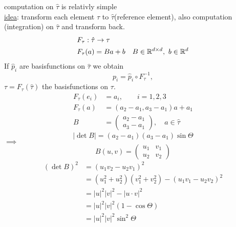 \par
computation on $\hat{\tau}$ is relativly simple\\
\underline{idea}: transform each element $\tau$ to $\hat{\tau}$(reference element), also computation (integration) on $\hat{\tau}$ and transform back.\\

\begin{align*}
	&F_{\tau}: \hat{\tau} \to \tau\\
	&F_{\tau}(a) = Ba +b \quad B\in \mathbb{R}^{d\times d},\ b \in \mathbb{R}^d
\end{align*}
If $\hat{p}_i$ are basisfunctions on $\hat{\tau}$ we obtain 
\begin{equation*}
	p_i = \hat{p}_i \circ F^{-1}_{\tau},
\end{equation*}
$\tau = F_{\tau}(\hat{\tau})$ the basisfunctions on $\tau$.
\begin{align*}
	F_{\tau}(e_i) &= a_i, \qquad i=1,2,3\\
	F_{\tau}(a) &= (a_2-a_1,a_3-a_1)a + a_1\\
	B &=
	\begin{pmatrix}
	a_2-a_1\\
	a_3-a_1
	\end{pmatrix}
	,\quad a \in \hat{\tau}
\end{align*}
\begin{equation*}
	|\det B| = (a_2-a_1)(a_3-a_1)\sin \Theta
\end{equation*}
$\implies$
\begin{equation*}
	B(u,v) = 
	\begin{pmatrix}
	u_1 & v_1\\
	u_2 & v_2
	\end{pmatrix}
\end{equation*}
\begin{align*}
	(\det B)^2 & = (u_1v_2 - u_2v_1)^2\\
	& = (u^2_1+ u^2_2)(v^2_1+v^2_2)-(u_1v_1-u_2v_2)^2\\
	& = |u|^2|v|^2 - |u\cdot v|^2\\
	& = |u|^2|v|^2 (1- \cos \Theta)\\
	& = |u|^2|v|^2 \sin^2\Theta
\end{align*}
